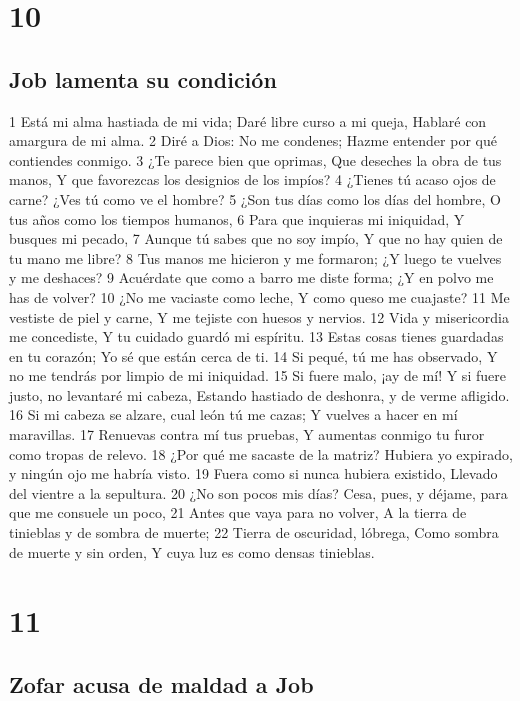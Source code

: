\chapter{10}

\section*{Job lamenta su condición}

1 Está mi alma hastiada de mi vida;
Daré libre curso a mi queja,
Hablaré con amargura de mi alma.
2 Diré a Dios: No me condenes;
Hazme entender por qué contiendes conmigo.
3 ¿Te parece bien que oprimas,
Que deseches la obra de tus manos,
Y que favorezcas los designios de los impíos?
4 ¿Tienes tú acaso ojos de carne?
¿Ves tú como ve el hombre?
5 ¿Son tus días como los días del hombre,
O tus años como los tiempos humanos,
6 Para que inquieras mi iniquidad,
Y busques mi pecado,
7 Aunque tú sabes que no soy impío,
Y que no hay quien de tu mano me libre?
8 Tus manos me hicieron y me formaron;
¿Y luego te vuelves y me deshaces?
9 Acuérdate que como a barro me diste forma;
¿Y en polvo me has de volver?
10 ¿No me vaciaste como leche,
Y como queso me cuajaste?
11 Me vestiste de piel y carne,
Y me tejiste con huesos y nervios. 
12 Vida y misericordia me concediste,
Y tu cuidado guardó mi espíritu.
13 Estas cosas tienes guardadas en tu corazón;
Yo sé que están cerca de ti.
14 Si pequé, tú me has observado,
Y no me tendrás por limpio de mi iniquidad. 
15 Si fuere malo, ¡ay de mí!
Y si fuere justo, no levantaré mi cabeza,
Estando hastiado de deshonra, y de verme afligido.
16 Si mi cabeza se alzare, cual león tú me cazas;
Y vuelves a hacer en mí maravillas.
17 Renuevas contra mí tus pruebas,
Y aumentas conmigo tu furor como tropas de relevo.
18 ¿Por qué me sacaste de la matriz?
Hubiera yo expirado, y ningún ojo me habría visto.
19 Fuera como si nunca hubiera existido,
Llevado del vientre a la sepultura.
20 ¿No son pocos mis días?
Cesa, pues, y déjame, para que me consuele un poco,
21 Antes que vaya para no volver,
A la tierra de tinieblas y de sombra de muerte;
22 Tierra de oscuridad, lóbrega,
Como sombra de muerte y sin orden,
Y cuya luz es como densas tinieblas.

\chapter{11}

\section*{Zofar acusa de maldad a Job}

